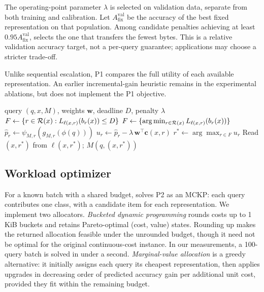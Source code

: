 The operating-point parameter $\lambda$ is selected on validation data,
separate from both training and calibration. Let
$A^{\mathrm{val}}_{\mathrm{fix}}$ be the accuracy of the best fixed
representation on that population. Among candidate penalties achieving at
least $0.95A^{\mathrm{val}}_{\mathrm{fix}}$, \system selects the one that
transfers the fewest bytes. This is a relative validation accuracy target,
not a per-query guarantee; applications may choose a stricter trade-off.

Unlike sequential escalation, P1 compares the full utility of each available
representation. An earlier incremental-gain heuristic remains in the
experimental ablations, but does not implement the P1 objective.

\begin{algorithm}[t]
\caption{Per-query representation selection (P1)}
\label{alg:p1}
\begin{algorithmic}[1]
\Require query $(q,x,M)$, weights $\mathbf{w}$, deadline $D$, penalty $\lambda$
\State $F\gets\{r\in\mathcal{R}(x): L_{\ell(x,r)}(b_r(x))\le D\}$ 
  \State $F\gets\{\arg\min_{r\in\mathcal{R}(x)}L_{\ell(x,r)}(b_r(x))\}$
\EndIf
{}
  \State $\widehat p_r\gets\psi_{M,r}(g_{M,r}(\phi(q)))$
  \State $u_r\gets\widehat p_r-\lambda\,\mathbf{w}^\top\mathbf{c}(x,r)$
\EndFor
\State $r^*\gets\arg\max_{r\in F}u_r$
\State Read $(x,r^*)$ from $\ell(x,r^*)$; \Return $M(q,(x,r^*))$
\end{algorithmic}
\end{algorithm}

\subsection{Workload optimizer}

For a known batch with a shared budget, \system solves P2 as an MCKP: each
query contributes one class, with a candidate item for each representation.
We implement two allocators. \emph{Bucketed dynamic programming} rounds costs
up to 1\,KiB buckets and retains Pareto-optimal (cost, value) states. Rounding
up makes the returned allocation feasible under the unrounded budget, though
it need not be optimal for the original continuous-cost instance. In our
measurements, a 100-query batch is solved in under a second.
\emph{Marginal-value allocation} is a greedy alternative: it initially assigns
each query its cheapest representation, then applies upgrades in decreasing
order of predicted accuracy gain per additional unit cost, provided they fit
within the remaining budget.

